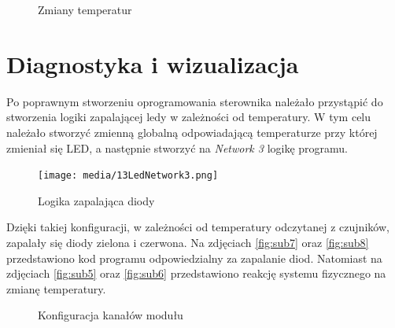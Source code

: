 \documentclass{article}
\begin{document}
\vspace{2em}

\begin{figure}[!ht]
    \centering
        \hfill
    \caption{Zmiany temperatur}
    \label{fig:main2}
\end{figure}

\newpage
\section{Diagnostyka i wizualizacja}
Po poprawnym stworzeniu oprogramowania sterownika należało przystąpić do stworzenia logiki zapalającej ledy w zależności od temperatury. W tym celu należało stworzyć zmienną globalną odpowiadającą temperaturze przy której zmieniał się LED, a następnie stworzyć na \textit{Network 3} logikę programu.

\begin{figure}[H]
    \centering
    \texttt{[image: media/13LedNetwork3.png]}
    \caption{Logika zapalająca diody}
    \label{fig:ledy}    
\end{figure}


\newpage
Dzięki takiej konfiguracji, w zależności od temperatury odczytanej z czujników, zapalały się diody zielona i czerwona. Na zdjęciach \ref{fig:sub7} oraz \ref{fig:sub8} przedstawiono kod programu odpowiedzialny za zapalanie diod. Natomiast na zdjęciach \ref{fig:sub5} oraz \ref{fig:sub6} przedstawiono reakcję systemu fizycznego na zmianę temperatury.
\begin{figure}[!ht]
    \centering
   
        \hfill
    \caption{Konfiguracja kanałów modułu}
    \label{fig:main3}
\end{figure}
\end{document}
